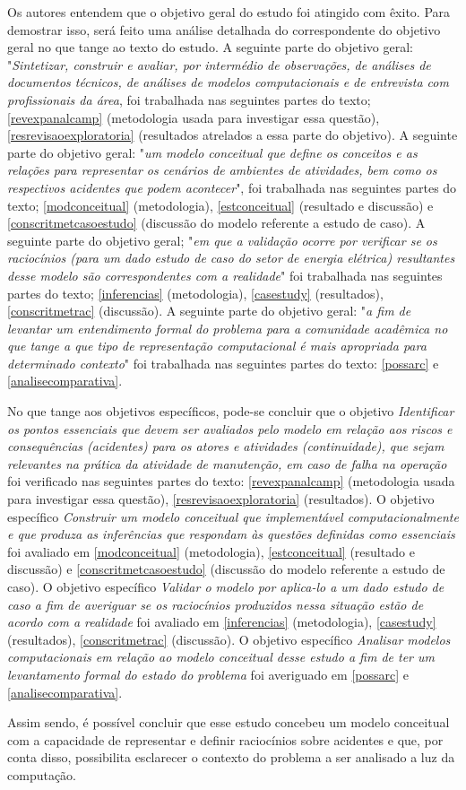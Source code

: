 Os autores entendem que o objetivo geral do estudo foi atingido com êxito. Para demostrar isso, será feito uma análise detalhada do correspondente do objetivo geral no que tange ao texto do estudo. A seguinte parte do objetivo geral: "\textit{Sintetizar, construir e avaliar, por intermédio de observações, de análises de documentos técnicos, de análises de modelos computacionais e de entrevista com profissionais da área}, foi trabalhada nas seguintes partes do texto; \ref{revexpanalcamp} (metodologia usada para investigar essa questão), \ref{resrevisaoexploratoria} (resultados atrelados a essa parte do objetivo).  A seguinte parte do objetivo geral: "\textit{um modelo conceitual que define os conceitos e as relações para representar os cenários de ambientes de atividades, bem como os respectivos acidentes que podem acontecer}", foi trabalhada nas seguintes partes do texto; \ref{modconceitual} (metodologia), \ref{estconceitual} (resultado e discussão) e \ref{conscritmetcasoestudo} (discussão do modelo referente a estudo de caso). A seguinte parte do objetivo geral; "\textit{em que a validação ocorre por verificar se os raciocínios (para um dado estudo de caso do setor de energia elétrica) resultantes desse modelo são correspondentes com a realidade}" foi trabalhada nas seguintes partes do texto; \ref{inferencias} (metodologia), \ref{casestudy} (resultados), \ref{conscritmetrac} (discussão). A seguinte parte do objetivo geral: "\textit{a fim de levantar um entendimento formal do problema para a comunidade acadêmica no que tange a que tipo de representação computacional é mais apropriada para determinado contexto}" foi trabalhada nas seguintes partes do texto: \ref{possarc} e \ref{analisecomparativa}.

No que tange aos objetivos específicos, pode-se concluir que o objetivo \textit{Identificar os pontos essenciais que devem ser avaliados pelo modelo em relação aos riscos e consequências (acidentes) para os atores e atividades (continuidade), que sejam relevantes na prática da atividade de manutenção, em caso de falha na operação} foi verificado nas seguintes partes do texto: \ref{revexpanalcamp} (metodologia usada para investigar essa questão), \ref{resrevisaoexploratoria} (resultados). O objetivo específico \textit{Construir um modelo conceitual que implementável computacionalmente e que produza as inferências que respondam às questões definidas como essenciais} foi avaliado em \ref{modconceitual} (metodologia), \ref{estconceitual} (resultado e discussão) e \ref{conscritmetcasoestudo} (discussão do modelo referente a estudo de caso). O objetivo específico \textit{Validar o modelo por aplica-lo a um dado estudo de caso a fim de averiguar se os raciocínios produzidos nessa situação estão de acordo com a realidade} foi avaliado em \ref{inferencias} (metodologia), \ref{casestudy} (resultados), \ref{conscritmetrac} (discussão). O objetivo específico \textit{Analisar modelos computacionais em relação ao modelo conceitual desse estudo a fim de ter um levantamento formal do estado do problema} foi averiguado em \ref{possarc} e \ref{analisecomparativa}.

Assim sendo, é possível concluir que esse estudo concebeu um modelo conceitual com a capacidade de representar e definir raciocínios sobre acidentes e que, por conta disso, possibilita esclarecer o contexto do problema a ser analisado a luz da computação. 